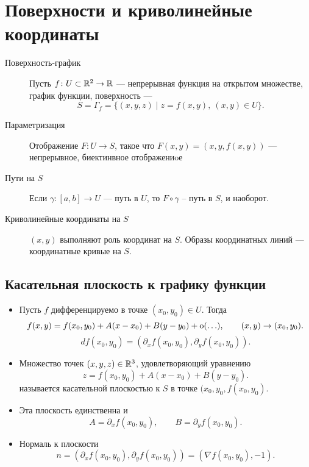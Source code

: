 \documentclass[11pt,dvipsnames]{report}
\begin{document}
\section{Поверхности и криволинейные координаты}
\begin{description}
    \item[Поверхность-график] Пусть $ f \colon U \subset \mathbb{R}^2 \to  \mathbb{R}$ --- непрерывная функция на открытом множестве, график функции, поверхность ---
	\[
	    S = \Gamma _f = \{(x, y, z) \mid z = f(x, y), ~ (x, y) \in U \}
	.\]
    \item  [Параметризация] Отображение $ F\colon U \to  S$, такое что $ F(x, y) = (x, y, f(x, y))$ --- непрерывное, биектинвное отображениoе
    \item [Пути на $ S$] Если  $ \gamma \colon [a, b] \to  U$ --- путь в $ U$, то  $ F \circ \gamma $ -- путь в $ S$, и наоборот.
    \item [Криволинейные координаты на $ S$]  $ (x, y) $ выполняют роль координат на  $ S$. Образы координатных линий --- координатные кривые на  $ S$.
\end{description}
\subsection{Касательная плоскость к графику функции}
\begin{itemize}
    \item Пусть $ f$  дифференцируемо в точке $ (x_0, y_0) \in U$. Тогда
	\[
	    f(x, y) = f(x_0, y_0) + A(x-x_0)+B(y-y_0)+{\mathop{\text{\rm o}}}(\ldots ), \qquad (x, y) \to  (x_0, y_0)
	.\]
	\[
	    df(x_0, y_0) = \left( \partial _xf(x_0, y_0), \partial _yf(x_0, y_0) \right)
	.\]
    \item Множество точек  $ (x, y, z) \in \mathbb{R}^3$, удовлетворяющий уравнению
	\[
	    z = f(x_0, y_0) + A(x-x_0) + B(y-y_0)
	.\]
	называется {\sf касательной плоскостью} к $ S$ в точке  $ (x_0, y_0, f(x_0, y_0)$.
    \item  Эта плоскость единственна и
	\[
	    A= \partial _xf(x_0, y_0) , \qquad B= \partial _yf(x_0, y_0)
	.\]
    \item Нормаль к плоскости
	\[
	    n = \left( \partial _xf(x_0, y_0), \partial _yf(x_0, y_0) \right) = \left( \nabla f(x_0, y_0), -1 \right)
	.\]
\end{itemize}
\end{document}
